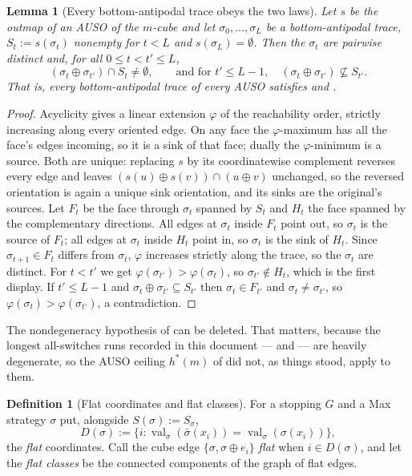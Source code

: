 \documentclass[11pt]{article}
\theoremstyle{plain}
\newtheorem{lemma}[theorem]{Lemma}
\theoremstyle{definition}
\newtheorem{definition}[theorem]{Definition}
\DeclareMathOperator{\val}{val}
\begin{document}
\begin{lemma}[Every bottom-antipodal trace obeys the two laws]\label{lem:auso-laws}
Let $s$ be the outmap of an AUSO of the $m$-cube and let
$\sigma_0,\dots,\sigma_L$ be a bottom-antipodal trace, $S_t:=s(\sigma_t)$
nonempty for $t<L$ and $s(\sigma_L)=\emptyset$. Then the $\sigma_t$ are pairwise
distinct and, for all $0\le t<t'\le L$,
\[
  (\sigma_t\oplus\sigma_{t'})\cap S_t\ne\emptyset,
  \qquad\text{and for }t'\le L-1,\quad
  (\sigma_t\oplus\sigma_{t'})\not\subseteq S_{t'} .
\]
That is, every bottom-antipodal trace of every AUSO satisfies
 and .
\end{lemma}

\begin{proof}
Acyclicity gives a linear extension $\varphi$ of the reachability order, strictly
increasing along every oriented edge. On any face the $\varphi$-maximum has all
the face's edges incoming, so it is a sink of that face; dually the
$\varphi$-minimum is a source. Both are unique: replacing $s$ by its
coordinatewise complement reverses every edge and leaves
$(s(u)\oplus s(v))\cap(u\oplus v)$ unchanged, so the reversed orientation is
again a unique sink orientation, and its sinks are the original's sources. Let $F_t$ be the face through $\sigma_t$
spanned by $S_t$ and $H_t$ the face spanned by the complementary directions. All
edges at $\sigma_t$ inside $F_t$ point out, so $\sigma_t$ is the source of $F_t$;
all edges at $\sigma_t$ inside $H_t$ point in, so $\sigma_t$ is the sink of
$H_t$. Since $\sigma_{t+1}\in F_t$ differs from $\sigma_t$, $\varphi$ increases
strictly along the trace, so the $\sigma_t$ are distinct. For $t<t'$ we get
$\varphi(\sigma_{t'})>\varphi(\sigma_t)$, so $\sigma_{t'}\notin H_t$, which is
the first display. If $t'\le L-1$ and $\sigma_t\oplus\sigma_{t'}\subseteq
S_{t'}$ then $\sigma_t\in F_{t'}$ and $\sigma_t\ne\sigma_{t'}$, so
$\varphi(\sigma_t)>\varphi(\sigma_{t'})$, a contradiction.
\end{proof}

\medskip
The nondegeneracy hypothesis of  can be deleted. That
matters, because the longest all-switches runs recorded in this document ---
 and  --- are
heavily degenerate, so the AUSO ceiling $h^{\ast}(m)$ of
 did not, as things stood, apply to them.

\begin{definition}[Flat coordinates and flat classes]\label{def:flat}
For a stopping $G$ and a Max strategy $\sigma$ put, alongside
$S(\sigma):=S_\sigma$,
\[
  D(\sigma):=\bigl\{i:\val_\sigma(\bar\sigma(x_i))=\val_\sigma(\sigma(x_i))\bigr\},
\]
the \emph{flat} coordinates. Call the cube edge $\{\sigma,\sigma\oplus e_i\}$
\emph{flat} when $i\in D(\sigma)$, and let the \emph{flat classes} be the
connected components of the graph of flat edges.
\end{definition}
\end{document}
